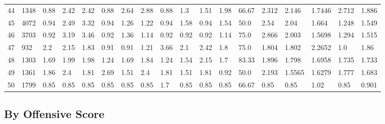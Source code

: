 \documentclass[landscape, 10pt]{report}
\begin{document}
\begin{longtable}{l || l || l | l | l | l | l | l | l | l | l | l | l || l | l | l | l | l}
44 & 1348 & 0.88 & 2.42 & 2.42 & 0.88 & 2.64 & 2.88 & 0.88 & 1.3 & 1.51 & 1.98 & 66.67 & 2.312 & 2.146 & 1.7446 & 2.712 & 1.886\\ 
\rowcolor{lightgray}45 & 4072 & 0.94 & 2.49 & 3.32 & 0.94 & 1.26 & 1.22 & 0.94 & 1.58 & 0.94 & 1.54 & 50.0 & 2.54 & 2.04 & 1.664 & 1.248 & 1.549\\ 
46 & 3703 & 0.92 & 3.19 & 3.46 & 0.92 & 1.36 & 1.14 & 0.92 & 0.92 & 0.92 & 1.14 & 75.0 & 2.866 & 2.003 & 1.5698 & 1.294 & 1.515\\ 
\rowcolor{lightgray}47 & 932 & 2.2 & 2.15 & 1.83 & 0.91 & 0.91 & 1.21 & 3.66 & 2.1 & 2.42 & 1.8 & 75.0 & 1.804 & 1.802 & 2.2652 & 1.0 & 1.86\\ 
48 & 1303 & 1.69 & 1.99 & 1.98 & 1.24 & 1.69 & 1.84 & 1.24 & 1.54 & 2.15 & 1.7 & 83.33 & 1.896 & 1.798 & 1.6958 & 1.735 & 1.733\\ 
\rowcolor{lightgray}49 & 1361 & 1.86 & 2.4 & 1.81 & 2.69 & 1.51 & 2.4 & 1.81 & 1.51 & 1.81 & 0.92 & 50.0 & 2.193 & 1.5565 & 1.6279 & 1.777 & 1.683\\ 
50 & 1799 & 0.85 & 0.85 & 0.85 & 0.85 & 0.85 & 0.85 & 1.7 & 0.85 & 0.85 & 0.85 & 66.67 & 0.85 & 0.85 & 1.02 & 0.85 & 0.901\\ 
\end{longtable} 
 
\pagebreak\subsection*{By Offensive Score} 
\end{document}
